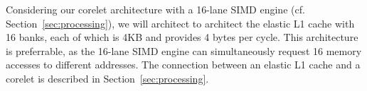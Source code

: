 Considering our corelet architecture with a 16-lane SIMD engine (cf. Section~\ref{sec:processing}), we will architect to architect the elastic L1 cache with 16 banks, each of which is 4KB and provides 4 bytes per cycle. 
This architecture is preferrable, as the 16-lane SIMD engine can simultaneously request 16 memory accesses to different addresses.
The connection between an elastic L1 cache and a corelet is described in Section~\ref{sec:processing}.


